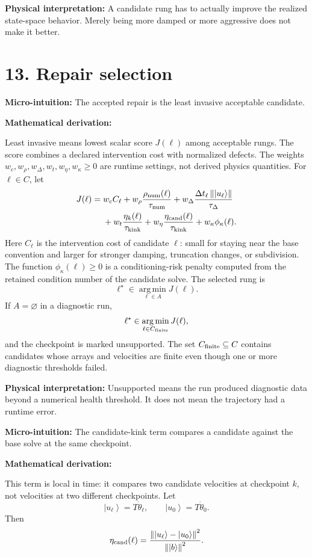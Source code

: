 \documentclass[10pt,twocolumn]{article}
\newcommand{\ket}[1]{\left|#1\right\rangle}
\newcommand{\norm}[1]{\left\lVert #1\right\rVert}
\newcommand{\argmin}{\operatorname*{arg\,min}}
\newcommand{\micro}[1]{%
  \par\smallskip
  \noindent\textcolor{deepblue}{\textbf{Micro-intuition:}} #1
  \par\smallskip}
\newcommand{\deriv}{%
  \par\noindent\textcolor{deepviolet}{\textbf{Mathematical derivation:}}\par\vspace{-1mm}}
\newcommand{\phys}[1]{%
  \par\smallskip
  \noindent\textcolor{deepgreen}{\textbf{Physical interpretation:}} #1
  \par\smallskip}
\begin{document}
\phys{A candidate rung has to actually improve the realized state-space
behavior. Merely being more damped or more aggressive does not make it better.}

\section*{13. Repair selection}

\micro{The accepted repair is the least invasive acceptable candidate.}

\deriv
Least invasive means lowest scalar score \(J(\ell)\) among acceptable rungs.
The score combines a declared intervention cost with normalized defects. The
weights \(w_c,w_\rho,w_\Delta,w_t,w_\eta,w_\kappa\ge0\) are runtime settings,
not derived physics quantities.
For \(\ell\in C\), let
\[
\begin{aligned}
J(\ell)
={}&
w_c C_\ell
+w_\rho\frac{\rho_{\rm num}(\ell)}{\tau_{\rm num}}
+w_\Delta
\frac{\Delta t_\ell\norm{\ket{u_\ell}}}{\tau_\Delta}\\
&+
w_t\frac{\eta_k(\ell)}{\tau_{\rm kink}}
+w_\eta\frac{\eta_{\rm cand}(\ell)}{\tau_{\rm kink}}
+w_\kappa\phi_\kappa(\ell).
\end{aligned}
\]
Here \(C_\ell\) is the intervention cost of candidate \(\ell\): small for
staying near the base convention and larger for stronger damping, truncation
changes, or subdivision. The function \(\phi_\kappa(\ell)\ge0\) is a
conditioning-risk penalty computed from the retained condition number of the
candidate solve.
The selected rung is
\[
\ell^\star\in\argmin_{\ell\in A}J(\ell).
\]
If \(A=\varnothing\) in a diagnostic run,
\[
\ell^\star\in\argmin_{\ell\in C_{\rm finite}}J(\ell),
\]
and the checkpoint is marked unsupported.
The set \(C_{\rm finite}\subseteq C\) contains candidates whose arrays and
velocities are finite even though one or more diagnostic thresholds failed.

\phys{Unsupported means the run produced diagnostic data beyond a numerical
health threshold. It does not mean the trajectory had a runtime error.}

\micro{The candidate-kink term compares a candidate against the base solve at
the same checkpoint.}

\deriv
This term is local in time: it compares two candidate velocities at checkpoint
\(k\), not velocities at two different checkpoints.
Let
\[
\ket{u_\ell}=T\dot\theta_\ell,\qquad \ket{u_0}=T\dot\theta_0.
\]
Then
\[
\eta_{\rm cand}(\ell)
=
\frac{\norm{\ket{u_\ell}-\ket{u_0}}^2}{\norm{\ket b}^2}.
\]
\end{document}
